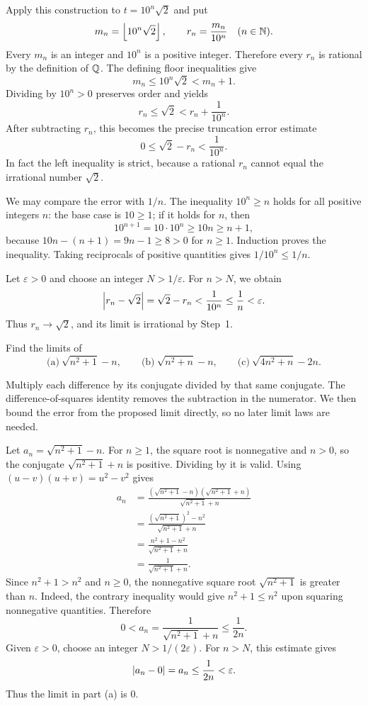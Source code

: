 Apply this construction to $t=10^n\sqrt2$ and put
\[
 m_n=\left\lfloor10^n\sqrt2\right\rfloor,
 \qquad r_n=\frac{m_n}{10^n}\quad(n\in\mathbb{N}).
\]
Every $m_n$ is an integer and $10^n$ is a positive integer.
Therefore every $r_n$ is rational by the definition of $\mathbb{Q}$.
The defining floor inequalities give
\[
 m_n\le10^n\sqrt2<m_n+1.
\]
Dividing by $10^n>0$ preserves order and yields
\[
 r_n\le\sqrt2<r_n+\frac1{10^n}.
\]
After subtracting $r_n$, this becomes the precise truncation error
estimate
\[
 0\le\sqrt2-r_n<\frac1{10^n}.
\]
In fact the left inequality is strict, because a rational $r_n$
cannot equal the irrational number $\sqrt2$.

We may compare the error with $1/n$. The inequality $10^n\ge n$
holds for all positive integers $n$: the base case is $10\ge1$;
if it holds for $n$, then
\[
 10^{n+1}=10\cdot10^n\ge10n\ge n+1,
\]
because $10n-(n+1)=9n-1\ge8>0$ for $n\ge1$.
Induction proves the inequality. Taking reciprocals of positive
quantities gives $1/10^n\le1/n$.

Let $\varepsilon>0$ and choose an integer $N>1/\varepsilon$.
For $n>N$, we obtain
\[
 \left|r_n-\sqrt2\right|
 =\sqrt2-r_n<\frac1{10^n}\le\frac1n<\varepsilon.
\]
Thus $r_n\to\sqrt2$, and its limit is irrational by Step~1.


\goal Find the limits of
\[
 \text{(a)}\ \sqrt{n^2+1}-n,\qquad
 \text{(b)}\ \sqrt{n^2+n}-n,\qquad
 \text{(c)}\ \sqrt{4n^2+n}-2n.
\]

\idea Multiply each difference by its conjugate divided by that
same conjugate. The difference-of-squares identity removes the
subtraction in the numerator. We then bound the error from the
proposed limit directly, so no later limit laws are needed.

Let $a_n=\sqrt{n^2+1}-n$. For $n\ge1$, the square root is
nonnegative and $n>0$, so the conjugate
$\sqrt{n^2+1}+n$ is positive. Dividing by it is valid.
Using $(u-v)(u+v)=u^2-v^2$ gives
\begin{align*}
 a_n
 &=\frac{(\sqrt{n^2+1}-n)(\sqrt{n^2+1}+n)}
         {\sqrt{n^2+1}+n}\\
 &=\frac{(\sqrt{n^2+1})^2-n^2}{\sqrt{n^2+1}+n}\\
 &=\frac{n^2+1-n^2}{\sqrt{n^2+1}+n}\\
 &=\frac1{\sqrt{n^2+1}+n}.
\end{align*}
Since $n^2+1>n^2$ and $n\ge0$, the nonnegative square root
$\sqrt{n^2+1}$ is greater than $n$. Indeed, the contrary inequality
would give $n^2+1\le n^2$ upon squaring nonnegative quantities.
Therefore
\[
 0<a_n=\frac1{\sqrt{n^2+1}+n}\le\frac1{2n}.
\]
Given $\varepsilon>0$, choose an integer $N>1/(2\varepsilon)$.
For $n>N$, this estimate gives
\[
 \left|a_n-0\right|=a_n\le\frac1{2n}<\varepsilon.
\]
Thus the limit in part \textup{(a)} is $0$.

